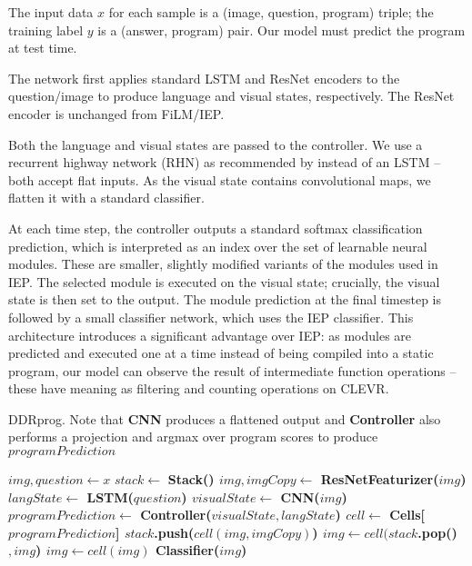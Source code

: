 \documentclass{article}
\begin{document}
The input data $x$ for each sample is a (image, question, program) triple; the training label $y$ is a (answer, program) pair. Our model must predict the program at test time.

The network first applies standard LSTM and ResNet \cite{DBLP:journals/corr/HeZRS15} encoders to the question/image to produce language and visual states, respectively. The ResNet encoder is unchanged from FiLM/IEP.

Both the language and visual states are passed to the controller. We use a recurrent highway network (RHN) \cite{DBLP:journals/corr/ZillySKS16} as recommended by \cite{NIPS2017_6919} instead of an LSTM \cite{Hochreiter:1997:LSM:1246443.1246450} -- both accept flat inputs. As the visual state contains convolutional maps, we flatten it with a standard classifier.

At each time step, the controller outputs a standard softmax classification prediction, which is interpreted as an index over the set of learnable neural modules. These are smaller, slightly modified variants of the modules used in IEP. The selected module is executed on the visual state; crucially, the visual state is then set to the output. The module prediction at the final timestep is followed by a small classifier network, which uses the IEP classifier. This architecture introduces a significant advantage over IEP: as modules are predicted and executed one at a time instead of being compiled into a static program, our model can observe the result of intermediate function operations -- these have meaning as filtering and counting operations on CLEVR. 
\begin{algorithm}[H]
\caption{DDRprog. Note that \textbf{CNN} produces a flattened output and \textbf{Controller} also performs a projection and argmax over program scores to produce $programPrediction$}
\begin{algorithmic}
\INPUT $img, question \gets x$
\STATE $stack \gets $ \bf{Stack}()
\STATE $img, imgCopy \gets$ \bf{ResNetFeaturizer}($img$)
\STATE $langState \gets$ \bf{LSTM}($question$)
	\STATE $visualState \gets$ CNN($img$)
	\STATE $programPrediction \gets$ Controller($visualState, langState$)
    \STATE $cell \gets$ \bf{Cells}[$programPrediction$]
    	\STATE $stack$.push($cell(img, imgCopy)$)
        \STATE $img \gets cell(stack$.pop()$, img$)
    \ELSE{}
    	\STATE $img \gets cell(img)$
    \ENDIF
\ENDFOR{}
\OUTPUT \bf{Classifier}($img$)
\end{algorithmic}
\end{algorithm}
\vspace{-5mm}
\end{document}
